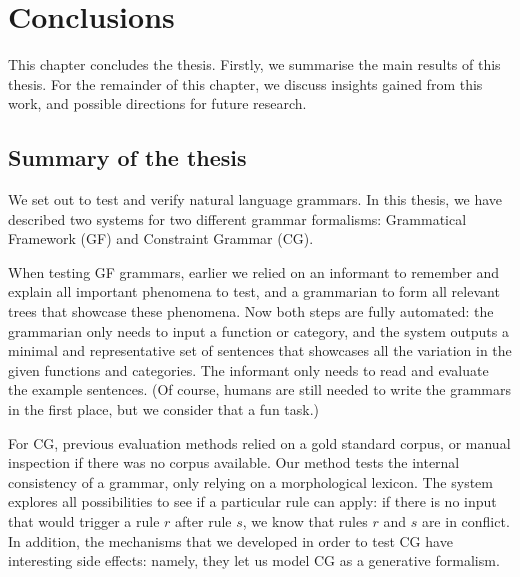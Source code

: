 \chapter{Conclusions}
\label{chapterConclusions}


This chapter concludes the thesis.  Firstly, we summarise the main
results of this thesis.  For the remainder of this chapter, we discuss
insights gained from this work, and possible directions for future
research.

\section{Summary of the thesis}

We set out to test and verify natural language grammars. In this
thesis, we have described two systems for two different grammar
formalisms: Grammatical Framework (GF) and Constraint Grammar (CG).

When testing GF grammars, earlier we relied on an informant to
remember and explain all important phenomena to test, and a
grammarian to form all relevant trees that showcase these phenomena. 
Now both steps are fully automated: the grammarian only needs to input
a function or category, and the system outputs a minimal and
representative set of sentences that showcases all the variation in
the given functions and categories. The informant only needs to read and
evaluate the example sentences.
(Of course, humans are still needed to write the grammars in the
first place, but we consider that a fun task.)

For CG, previous evaluation methods relied on a gold standard corpus,
or manual inspection if there was no corpus available. Our method
tests the internal consistency of a grammar, only relying on a
morphological lexicon. The system explores all possibilities to see if
a particular rule can apply: if there is no input that would trigger a
rule $r$ after rule $s$, we know that rules $r$ and $s$ are in
conflict.  In addition, the mechanisms that we developed in order
to test CG have interesting side effects: namely, they let us model CG
as a generative formalism.



